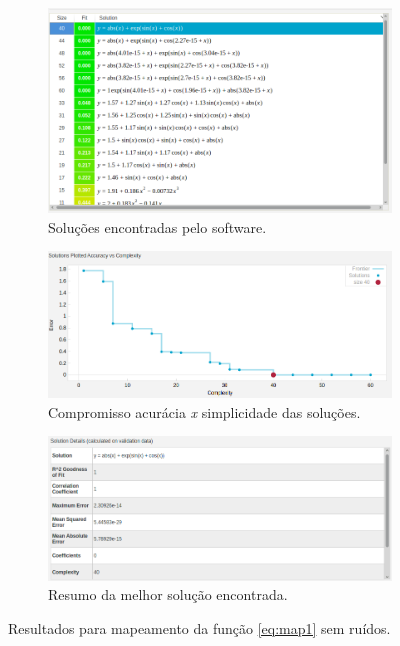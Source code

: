 	\begin{figure}[h!]
	
	\centering
	
		\begin{subfigure}{.45\textwidth} 
		  \centering
		  \includegraphics[width=1\linewidth]{image/solucoes_map1}
		  \caption{\centering Soluções encontradas pelo software.} 
		  \label{fig:map1_solucoes_s_ruido} 
		\end{subfigure}%
		\begin{subfigure}{.55\textwidth}
		  \centering
		  \includegraphics[width=1\linewidth]{image/pareto_map1}
		  \caption{\centering Compromisso acurácia \textit{x} simplicidade das
		  soluções.}
		  \label{fig:map1_pareto_s_ruido} 
		\end{subfigure}
	
		\begin{subfigure}{.65\textwidth}
		  \centering
		  \includegraphics[width=1\linewidth]{image/best_solucao_map1}
		  \caption{\centering Resumo da melhor solução encontrada.}
		  \label{fig:map1_best_s_ruido} 
		\end{subfigure}
	
	\caption{Resultados para mapeamento da função \ref{eq:map1} sem ruídos.}
	\end{figure}
	
